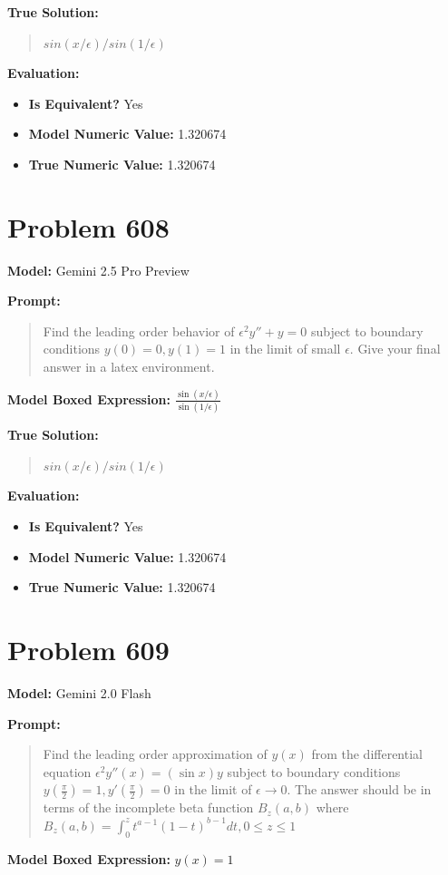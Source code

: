 \documentclass{article}
\begin{document}
\textbf{True Solution:}
\begin{quote}
$sin(x/\epsilon)/sin(1/\epsilon)$
\end{quote}

\textbf{Evaluation:}
\begin{itemize}
\item \textbf{Is Equivalent?} Yes
\item \textbf{Model Numeric Value:} 1.320674
\item \textbf{True Numeric Value:} 1.320674
\end{itemize}
\vspace{1cm}
\section*{Problem 608}
\textbf{Model:} Gemini 2.5 Pro Preview

\textbf{Prompt:}
\begin{quote}
Find the leading order behavior of $\epsilon^2 y'' + y = 0$ subject to boundary conditions $y(0)=0, y(1)=1$ in the limit of small $\epsilon$. Give your final answer in a \boxed latex environment.
\end{quote}
\textbf{Model Boxed Expression:} $\frac{\sin(x/\epsilon)}{\sin(1/\epsilon)}$

\textbf{True Solution:}
\begin{quote}
$sin(x/\epsilon)/sin(1/\epsilon)$
\end{quote}

\textbf{Evaluation:}
\begin{itemize}
\item \textbf{Is Equivalent?} Yes
\item \textbf{Model Numeric Value:} 1.320674
\item \textbf{True Numeric Value:} 1.320674
\end{itemize}
\vspace{1cm}
\section*{Problem 609}
\textbf{Model:} Gemini 2.0 Flash

\textbf{Prompt:}
\begin{quote}
Find the leading order approximation of $y(x)$ from the differential equation $\epsilon^2 y''(x)=(\sin x) y$ subject to boundary conditions $y(\frac{\pi}{2}) = 1, y'(\frac{\pi}{2}) = 0$ in the limit of $\epsilon \to 0$. The answer should be in terms of the incomplete beta function $B_z(a, b)$ where $B_z(a, b)=\int_0^z t^{a-1}(1-t)^{b-1} d t, 0 \leq z \leq 1$
\end{quote}
\textbf{Model Boxed Expression:} $y(x) = 1$
\end{document}
